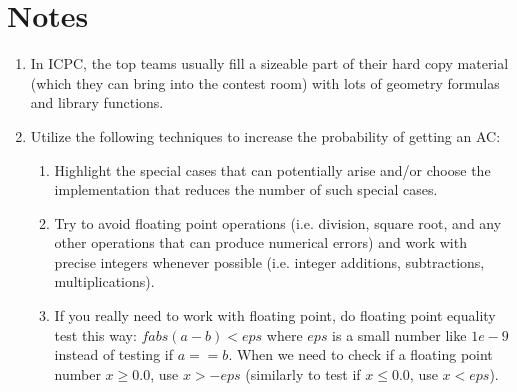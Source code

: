 \documentclass[12pt]{book}
\begin{document}
\section{Notes}
\begin{enumerate}[label = \roman*.]
\item
In ICPC, the top teams usually fill a sizeable part of their hard copy material (which they can bring into the contest room) with lots of geometry formulas and library functions.
\item
Utilize the following techniques to increase the probability of getting an AC:

\begin{enumerate}[label = \roman*.]
\item Highlight the special cases that can potentially arise and/or choose the implementation that reduces the number of such special cases.
\item  Try to avoid floating point operations (i.e. division, square root, and any other operations that can produce numerical errors) and work with precise integers whenever possible (i.e. integer additions, subtractions, multiplications).
\item  If you really need to work with floating point, do floating point equality test this way: $fabs(a - b) < eps$ where $eps$ is a small number like $1e-9$ instead of testing if $a == b$. When we need to check if a floating point number $x \geq 0.0$, use $x > -eps$ (similarly to test if $x \leq 0.0$, use $x < eps$).
\end{enumerate}
\end{enumerate}
\end{document}
